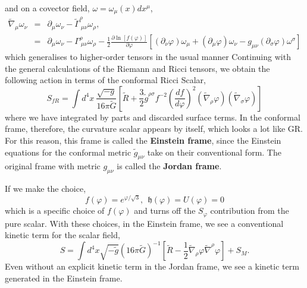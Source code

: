 and on a covector field, $\omega = \omega_{\mu} (x)dx^{\mu}$, 
\begin{eqnarray*}
    \tilde{\nabla}_{\mu}\omega_{\nu} &=& \partial_{\mu}\omega_{\nu} - \tilde{\Gamma}^{\rho}_{\ \mu\nu}\omega_{\rho},\\
    &=& \partial_{\mu}\omega_{\nu} - \Gamma^{\rho}_{\ \mu\nu}\omega_{\rho} - \frac{1}{2}\frac{\partial \ln[f(\varphi)]}{\partial \varphi}\left[(\partial_{\nu}\varphi)\omega_{\mu} + (\partial_{\mu}\varphi)\omega_{\nu} -g_{\mu\nu}(\partial_{\sigma}\varphi)\omega^{\sigma}\right]
\end{eqnarray*}
which generalises to higher-order tensors in the usual manner Continuing with the general calculations of the Riemann and Ricci tensors, we obtain the following action in terms of the conformal Ricci Scalar,
\begin{equation}
    S_{fR}= \int d^4x\ \frac{\sqrt{-g}}{16\pi\tilde{G}}\left[\tilde{R} + \frac{3}{2}\tilde{g}^{\rho\sigma}f^{-2}\left(\frac{df}{d\varphi}\right)^2(\tilde{\nabla}_{\rho}\varphi)(\tilde{\nabla}_{\sigma}\varphi)\right]
\end{equation}
where we have integrated by parts and discarded surface terms. In the conformal frame, therefore, the curvature scalar appears by itself, which looks a lot like GR. For this reason, this frame is called the \textbf{Einstein frame}, since the Einstein equations for the conformal metric $\tilde{g}_{\mu\nu}$ take on their conventional form. The original frame with metric $g_{\mu\nu}$ is called the \textbf{Jordan frame}. 

If we make the choice,
\begin{equation}
    f(\varphi) = e^{\varphi/\sqrt{3}}, \ \ \mathfrak{h}(\varphi) = U(\varphi) = 0 
\end{equation}
which is a specific choice of $f(\varphi)$ and turns off the $S_{\varphi}$ contribution from the pure scalar. With these choices, in the Einstein frame, we see a conventional kinetic term for the scalar field,
\begin{equation}
    S = \int d^{4}x \sqrt{-\tilde{g}}(16\pi\tilde{G})^{-1}\left[\tilde{R} - \frac{1}{2}\tilde{\nabla}_{\rho}\varphi\tilde{\nabla}^{\rho}\varphi\right] + S_{M}.
\end{equation}
Even without an explicit kinetic term in the Jordan frame, we see a kinetic term generated in the Einstein frame. 
